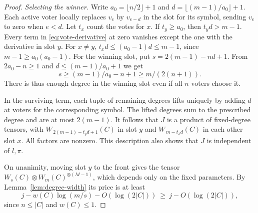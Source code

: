 \begin{proof}
\emph{Selecting the winner.}
Write \(a_0=\lfloor n/2\rfloor+1\) and
\(d=\lfloor(m-1)/a_0\rfloor+1\).
Each active voter locally replaces \(v_e\) by \(v_{e-d}\) in the slot
for its symbol, sending \(v_e\) to zero when \(e<d\). Let \(t_x\)
count the votes for \(x\). If \(t_y\ge a_0\), then \(t_yd>m-1\).
Every term in \eqref{eq:vote-derivative} at zero vanishes except the
one with the derivative in slot \(y\). For \(x\ne y\),
\(t_xd\le(a_0-1)d\le m-1\), since \(m-1\ge a_0(a_0-1)\).
For the winning slot, put \(s=2(m-1)-nd+1\). From \(2a_0-n\ge1\)
and \(d\le(m-1)/a_0+1\) we get
\[
             s\ge(m-1)/a_0-n+1\ge m/(2(n+1)).
\]
There is thus enough degree in the winning slot even if all \(n\)
voters choose it.

In the surviving term, each tuple of remaining degrees lifts uniquely
by adding \(d\) at voters for the corresponding symbol. The lifted
degrees sum to the prescribed degree and are at most \(2(m-1)\).
It follows that \(J\) is a product of fixed-degree tensors, with
\(W_{\,2(m-1)-t_y d+1}(C)\) in slot \(y\) and \(W_{\,m-t_x d}(C)\) in
each other slot \(x\). All factors are nonzero. This description also
shows that \(J\) is independent of \(l,\pi\).

On unanimity, moving slot \(y\) to the front gives the tensor
\(W_s(C)\otimes W_m(C)^{\otimes(M-1)}\), which depends only on the fixed
parameters. By Lemma~\ref{lem:degree-width} its price is at least
\[
     j-w(C)\log(m/s)-O(\log(2|C|))
                         \ \ge\ j-O(\log(2|C|)),
\]
since \(n\le |C|\) and \(w(C)\le1\).
\end{proof}


